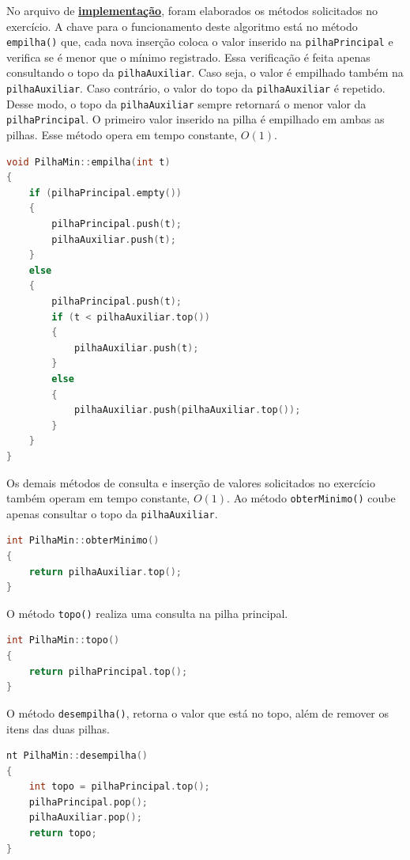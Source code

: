 \documentclass[
  brazilian,
  paper=a4,
  oneside  ,captions=tableheading
]{scrbook}
\newcommand{\passthrough}[1]{#1}
\begin{document}
No arquivo de
\href{https://github.com/ecostadelle/lista_pilhas_filas/blob/main/include/obterMinimo.cpp}{\textbf{implementação}},
foram elaborados os métodos solicitados no exercício. A chave para o
funcionamento deste algoritmo está no método
\passthrough{\lstinline!empilha()!} que, cada nova inserção coloca o
valor inserido na \passthrough{\lstinline!pilhaPrincipal!} e verifica se
é menor que o mínimo registrado. Essa verificação é feita apenas
consultando o topo da \passthrough{\lstinline!pilhaAuxiliar!}. Caso
seja, o valor é empilhado também na
\passthrough{\lstinline!pilhaAuxiliar!}. Caso contrário, o valor do topo
da \passthrough{\lstinline!pilhaAuxiliar!} é repetido. Desse modo, o
topo da \passthrough{\lstinline!pilhaAuxiliar!} sempre retornará o menor
valor da \passthrough{\lstinline!pilhaPrincipal!}. O primeiro valor
inserido na pilha é empilhado em ambas as pilhas. Esse método opera em
tempo constante, \(O(1)\).

\begin{lstlisting}[language={C++}]
void PilhaMin::empilha(int t)
{
    if (pilhaPrincipal.empty())
    {
        pilhaPrincipal.push(t);
        pilhaAuxiliar.push(t);
    }
    else
    {
        pilhaPrincipal.push(t);
        if (t < pilhaAuxiliar.top())
        {
            pilhaAuxiliar.push(t);
        }
        else
        {
            pilhaAuxiliar.push(pilhaAuxiliar.top());
        }
    }
}
\end{lstlisting}

Os demais métodos de consulta e inserção de valores solicitados no
exercício também operam em tempo constante, \(O(1)\). Ao método
\passthrough{\lstinline!obterMinimo()!} coube apenas consultar o topo da
\passthrough{\lstinline!pilhaAuxiliar!}.

\begin{lstlisting}[language={C++}]
int PilhaMin::obterMinimo()
{
    return pilhaAuxiliar.top();
}
\end{lstlisting}

O método \passthrough{\lstinline!topo()!} realiza uma consulta na pilha
principal.

\begin{lstlisting}[language={C++}]
int PilhaMin::topo()
{
    return pilhaPrincipal.top();
}
\end{lstlisting}

O método \passthrough{\lstinline!desempilha()!}, retorna o valor que
está no topo, além de remover os itens das duas pilhas.

\begin{lstlisting}[language={C++}]
nt PilhaMin::desempilha()
{
    int topo = pilhaPrincipal.top();
    pilhaPrincipal.pop();
    pilhaAuxiliar.pop();
    return topo;
}
\end{lstlisting}
\end{document}
